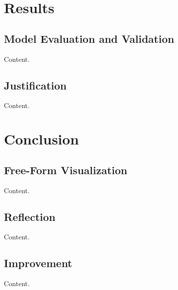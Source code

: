 \documentclass{article}
\begin{document}
\section{Results}

\subsection{Model Evaluation and Validation}

Content.

\subsection{Justification}

Content.

\section{Conclusion}

\subsection{Free-Form Visualization}

Content.

\subsection{Reflection}

Content.

\subsection{Improvement}

Content.




\end{document}
